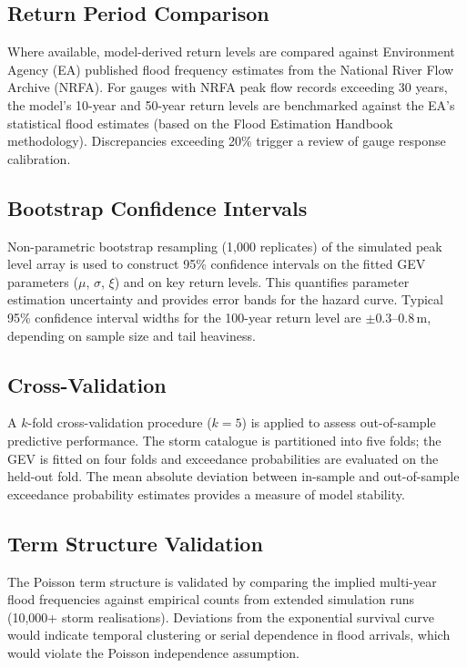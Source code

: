 \documentclass[11pt,a4paper]{article}
\begin{document}
\subsection{Return Period Comparison}

Where available, model-derived return levels are compared against Environment Agency (EA) published flood frequency estimates from the National River Flow Archive (NRFA). For gauges with NRFA peak flow records exceeding 30 years, the model's 10-year and 50-year return levels are benchmarked against the EA's statistical flood estimates (based on the Flood Estimation Handbook methodology). Discrepancies exceeding 20\% trigger a review of gauge response calibration.

\subsection{Bootstrap Confidence Intervals}

Non-parametric bootstrap resampling (1{,}000 replicates) of the simulated peak level array is used to construct 95\% confidence intervals on the fitted GEV parameters ($\mu$, $\sigma$, $\xi$) and on key return levels. This quantifies parameter estimation uncertainty and provides error bands for the hazard curve. Typical 95\% confidence interval widths for the 100-year return level are $\pm 0.3$--$0.8$\,m, depending on sample size and tail heaviness.

\subsection{Cross-Validation}

A $k$-fold cross-validation procedure ($k = 5$) is applied to assess out-of-sample predictive performance. The storm catalogue is partitioned into five folds; the GEV is fitted on four folds and exceedance probabilities are evaluated on the held-out fold. The mean absolute deviation between in-sample and out-of-sample exceedance probability estimates provides a measure of model stability.

\subsection{Term Structure Validation}

The Poisson term structure is validated by comparing the implied multi-year flood frequencies against empirical counts from extended simulation runs (10{,}000+ storm realisations). Deviations from the exponential survival curve would indicate temporal clustering or serial dependence in flood arrivals, which would violate the Poisson independence assumption.
\end{document}
